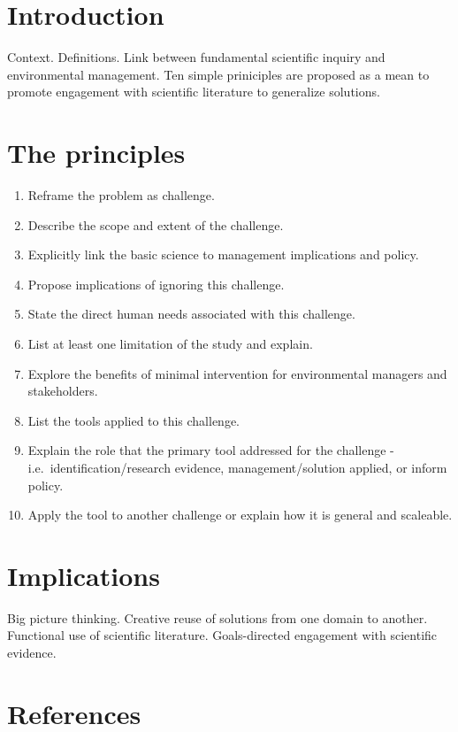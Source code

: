 \documentclass[10pt,letterpaper]{article}
\begin{document}
\section{Introduction}\label{introduction}

Context. Definitions. Link between fundamental scientific inquiry and
environmental management. Ten simple priniciples are proposed as a mean
to promote engagement with scientific literature to generalize
solutions.

\section{The principles}\label{the-principles}

\begin{enumerate}
\def\labelenumi{\arabic{enumi}.}
\item
  Reframe the problem as challenge.
\item
  Describe the scope and extent of the challenge.
\item
  Explicitly link the basic science to management implications and
  policy.
\item
  Propose implications of ignoring this challenge.
\item
  State the direct human needs associated with this challenge.
\item
  List at least one limitation of the study and explain.
\item
  Explore the benefits of minimal intervention for environmental
  managers and stakeholders.
\item
  List the tools applied to this challenge.
\item
  Explain the role that the primary tool addressed for the challenge -
  i.e.~identification/research evidence, management/solution applied, or
  inform policy.
\item
  Apply the tool to another challenge or explain how it is general and
  scaleable.
\end{enumerate}

\section{Implications}\label{implications}

Big picture thinking. Creative reuse of solutions from one domain to
another. Functional use of scientific literature. Goals-directed
engagement with scientific evidence.

\section*{References}\label{references}

\nolinenumbers
\end{document}
